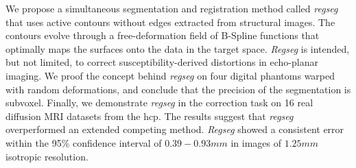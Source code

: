 We propose a simultaneous segmentation and registration method called \emph{regseg}
  that uses active contours without edges extracted from structural images.
The contours evolve through a free-deformation field of B-Spline functions that
  optimally maps the surfaces onto the data in the target space.
\emph{Regseg} is intended, but not limited, to correct susceptibility-derived distortions
  in echo-planar imaging.
We proof the concept behind \emph{regseg} on four digital phantoms warped with random
  deformations, and conclude that the precision of the segmentation is subvoxel.
Finally, we demonstrate \emph{regseg} in the correction task on 16 real diffusion MRI
  datasets from the \acrlong*{hcp}.
The results suggest that \emph{regseg} overperformed an extended competing method.
\emph{Regseg} showed a consistent error within the 95\% confidence interval of
  $0.39-0.93mm$ in images of $1.25mm$ isotropic resolution.

